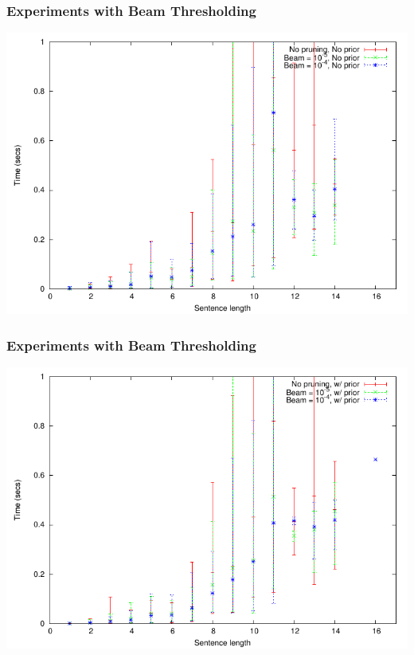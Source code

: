 \begin{frame}
\frametitle{Experiments with Beam Thresholding}
\includegraphics[scale=.85]{figures/timing-without-prior.pdf}
\end{frame}

\begin{frame}
\frametitle{Experiments with Beam Thresholding}
\includegraphics[scale=.85]{figures/timing-with-prior.pdf}
\end{frame}


